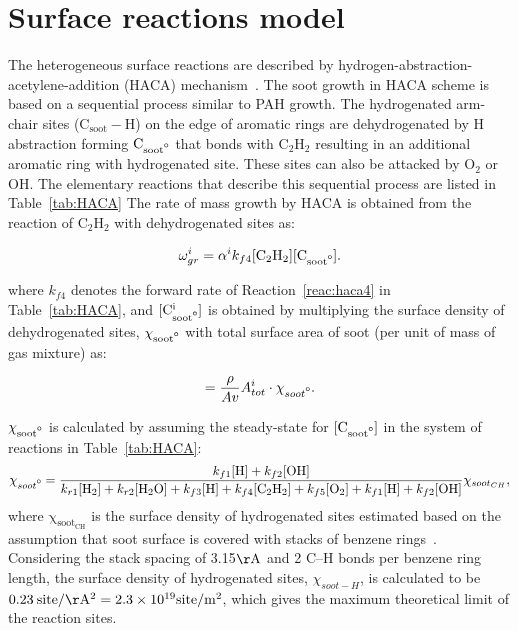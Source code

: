 \section{Surface reactions model}
\label{sec:surfreacmodel}
The heterogeneous surface reactions are described by hydrogen-abstraction-acetylene-addition (HACA) mechanism~\citep{frenklach1991detailed, appel2000kinetic}. The soot growth in HACA scheme is based on a sequential process similar to PAH growth. The hydrogenated arm-chair sites ($\mathrm{C_{soot}-H}$) on the edge of aromatic rings are dehydrogenated by H abstraction forming $\mathrm{C_{soot\mbox{\textdegree}}}$ that bonds with $\mathrm{C_2H_2}$ resulting in an additional aromatic ring with hydrogenated site. These sites can also be attacked by $\mathrm{O_2}$ or $\mathrm{OH}$. The elementary reactions that describe this sequential process are listed in Table~\ref{tab:HACA}
The rate of mass growth by HACA is obtained from the reaction of $\mathrm{C_2H_2}$ with dehydrogenated sites as:

\begin{equation}
	\omega^i_{gr} = \alpha^i k_{f4} [\mathrm{C_2H_2}][\mathrm{C_{soot\mbox{\textdegree}}}]
	\label{eqn:hacaRate}.
\end{equation}

\noindent where ${k_{f4}}$ denotes the forward rate of Reaction~\ref{reac:haca4} in Table~\ref{tab:HACA}, and $\mathrm{[C^i_{soot\mbox{\textdegree}}]}$ is obtained by multiplying the surface density of dehydrogenated sites, $\mathrm{\chi_{soot\mbox{\textdegree}}}$ with total surface area of soot (per unit of mass of gas mixture) as:

\begin{equation}
	[\mathrm{C^i_{soot\mbox{\textdegree}}}] = \frac{\rho}{Av}A^i_{tot}\cdot\chi_{soot\mbox{\textdegree}}
	\label{eqn:csoot0}.
\end{equation}

$\mathrm{\chi_{soot\mbox{\textdegree}}}$ is calculated by assuming the steady-state for $\mathrm{[C_{soot\mbox{\textdegree}}]}$ in the system of reactions in Table~\ref{tab:HACA}:
\begin{equation}
	\chi_{soot\mbox{\textdegree}} = 
	\frac
	{k_{f1}[\mathrm{H}]+k_{f2}[\mathrm{OH}]}
	{k_{r1}[\mathrm{H_2}]+k_{r2}[\mathrm{H_2O}]+k_{f3}[\mathrm{H}]+k_{f4}[\mathrm{C_2H_2}]+k_{f5}[\mathrm{O_2}]+k_{f1}[\mathrm{H}]+k_{f2}[\mathrm{OH}]} \chi_{soot_{CH}}
	\label{eqn:chisoot0},
\end{equation}
\noindent where $\mathrm{\chi_{soot_{CH}}}$ is the surface density of hydrogenated sites estimated based on the assumption that soot surface is covered with stacks of benzene rings~\citep{appel2000kinetic}. Considering the stack spacing of 3.15$\mathrm{\AA}$ and 2 C–H bonds per benzene ring length, the surface density of hydrogenated sites, $\chi_{{soot}-H}$, is calculated to be $0.23\:\mathrm{site/\AA^2}=2.3\times10^{19} \mathrm{site/m^2}$, which gives the maximum theoretical limit of the reaction sites.

